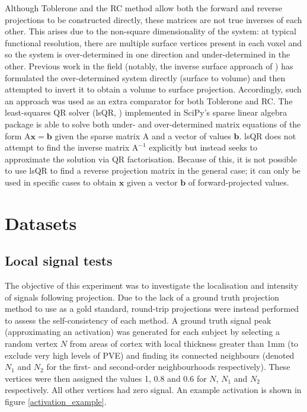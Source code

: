 \documentclass[12pt]{report}
\newcommand{\mat}[1]{\mathrm{#1}}
\renewcommand{\vec}[1]{\mathbf{#1}}
\begin{document}
Although Toblerone and the RC method allow both the forward and reverse projections to be constructed directly, these matrices are not true inverses of each other. This arises due to the non-square dimensionality of the system: at typical functional resolution, there are multiple surface vertices present in each voxel and so the system is over-determined in one direction and under-determined in the other. Previous work in the field (notably, the inverse surface approach of \cite{Lonjaret2017}) has formulated the over-determined system directly (surface to volume) and then attempted to invert it to obtain a volume to surface projection. Accordingly, such an approach was used as an extra comparator for both Toblerone and RC. The least-squares QR solver (lsQR, \cite{10.1145/355984.355989}) implemented in SciPy's sparse linear algebra package is able to solve both under- and over-determined matrix equations of the form $\mathrm{A}\vec{x} = \vec{b}$ given the sparse matrix $\mat{A}$ and a vector of values $\vec{b}$. lsQR does not attempt to find the inverse matrix $\mat{A}^{-1}$ explicitly but instead seeks to approximate the solution via QR factorisation. Because of this, it is not possible to use lsQR to find a reverse projection matrix in the general case; it can only be used in specific cases to obtain $\vec{x}$ given a vector $\vec{b}$ of forward-projected values. 

\section{Datasets}
\subsection{Local signal tests}
The objective of this experiment was to investigate the localisation and intensity of signals following projection. Due to the lack of a ground truth projection method to use as a gold standard, round-trip projections were instead performed to assess the self-consistency of each method. A ground truth signal peak (approximating an activation) was generated for each subject by selecting a random vertex $N$ from areas of cortex with local thickness greater than 1mm (to exclude very high levels of PVE) and finding its connected neighbours (denoted $N_1$ and $N_2$ for the first- and second-order neighbourhoods respectively). These vertices were then assigned the values 1, 0.8 and 0.6 for $N$, $N_1$ and $N_2$ respectively. All other vertices had zero signal. An example activation is shown in figure \ref{activation_example}. 
\end{document}
